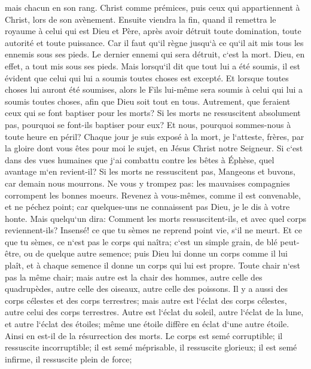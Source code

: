\verse mais chacun en son rang. Christ comme prémices, puis ceux qui appartiennent à Christ, lors de son avènement. 
\verse Ensuite viendra la fin, quand il remettra le royaume à celui qui est Dieu et Père, après avoir détruit toute domination, toute autorité et toute puissance. 
\verse Car il faut qu`il règne jusqu`à ce qu`il ait mis tous les ennemis sous ses pieds. 
\verse Le dernier ennemi qui sera détruit, c`est la mort. 
\verse Dieu, en effet, a tout mis sous ses pieds. Mais lorsqu`il dit que tout lui a été soumis, il est évident que celui qui lui a soumis toutes choses est excepté. 
\verse Et lorsque toutes choses lui auront été soumises, alors le Fils lui-même sera soumis à celui qui lui a soumis toutes choses, afin que Dieu soit tout en tous. 
\verse Autrement, que feraient ceux qui se font baptiser pour les morts? Si les morts ne ressuscitent absolument pas, pourquoi se font-ils baptiser pour eux? 
\verse Et nous, pourquoi sommes-nous à toute heure en péril? 
\verse Chaque jour je suis exposé à la mort, je l`atteste, frères, par la gloire dont vous êtes pour moi le sujet, en Jésus Christ notre Seigneur. 
\verse Si c`est dans des vues humaines que j`ai combattu contre les bêtes à Éphèse, quel avantage m`en revient-il? Si les morts ne ressuscitent pas, Mangeons et buvons, car demain nous mourrons. 
\verse Ne vous y trompez pas: les mauvaises compagnies corrompent les bonnes moeurs. 
\verse Revenez à vous-mêmes, comme il est convenable, et ne péchez point; car quelques-uns ne connaissent pas Dieu, je le dis à votre honte. 
\verse Mais quelqu`un dira: Comment les morts ressuscitent-ils, et avec quel corps reviennent-ils? 
\verse Insensé! ce que tu sèmes ne reprend point vie, s`il ne meurt. 
\verse Et ce que tu sèmes, ce n`est pas le corps qui naîtra; c`est un simple grain, de blé peut-être, ou de quelque autre semence; 
\verse puis Dieu lui donne un corps comme il lui plaît, et à chaque semence il donne un corps qui lui est propre. 
\verse Toute chair n`est pas la même chair; mais autre est la chair des hommes, autre celle des quadrupèdes, autre celle des oiseaux, autre celle des poissons. 
\verse Il y a aussi des corps célestes et des corps terrestres; mais autre est l`éclat des corps célestes, autre celui des corps terrestres. 
\verse Autre est l`éclat du soleil, autre l`éclat de la lune, et autre l`éclat des étoiles; même une étoile diffère en éclat d`une autre étoile. 
\verse Ainsi en est-il de la résurrection des morts. Le corps est semé corruptible; il ressuscite incorruptible; 
\verse il est semé méprisable, il ressuscite glorieux; il est semé infirme, il ressuscite plein de force; 
